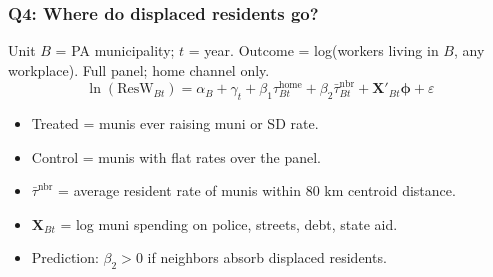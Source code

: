\documentclass[xcolor = x11names, compress, aspectratio = 169]{beamer}
\renewcommand{\(}{\begin{columns}}
\renewcommand{\)}{\end{columns}}
\newcommand{\<}[1]{\begin{column}{#1}}
\renewcommand{\>}{\end{column}}
\begin{document}
\iffalse %
\begin{frame}
\frametitle{Q4: Where do displaced residents go?}
    \small
    Unit $B$ = PA municipality; $t$ = year. Outcome = log(workers
    living in $B$, any workplace). Full panel; home channel only.
    \[
    \ln(\text{ResW}_{Bt}) = \alpha_B + \gamma_t + \beta_1 \tau^{\text{home}}_{Bt} + \beta_2 \bar{\tau}^{\text{nbr}}_{Bt} + \mathbf{X}'_{Bt}\boldsymbol{\phi} + \varepsilon
    \]
    \footnotesize
    \begin{itemize}
        \item Treated = munis ever raising muni or SD rate.
        \item Control = munis with flat rates over the panel.
        \item $\bar{\tau}^{\text{nbr}}$ = average resident rate of
        munis within 80 km centroid distance.
        \item $\mathbf{X}_{Bt}$ = log muni spending on police, streets,
        debt, state aid.
        \item Prediction: $\beta_2 > 0$ if neighbors absorb displaced residents.
    \end{itemize}
\end{frame}
\end{document}
